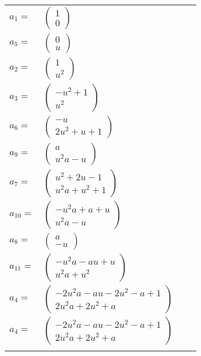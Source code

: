 \documentclass[1p]{elsarticle_modified}
\theoremstyle{definition}
\begin{document}
\begin{tabular}{m{7pt} m{180pt} m{7pt} m{180pt} }
\flushright $a_{1}=$&$\begin{pmatrix}1\\0\end{pmatrix}$ \\
\flushright $a_{5}=$&$\begin{pmatrix}0\\u\end{pmatrix}$ \\
\flushright $a_{2}=$&$\begin{pmatrix}1\\u^2\end{pmatrix}$ \\
\flushright $a_{3}=$&$\begin{pmatrix}- u^2+1\\u^2\end{pmatrix}$ \\
\flushright $a_{6}=$&$\begin{pmatrix}- u\\2 u^2+u+1\end{pmatrix}$ \\
\flushright $a_{9}=$&$\begin{pmatrix}a\\u^2 a- u\end{pmatrix}$ \\
\flushright $a_{7}=$&$\begin{pmatrix}u^2+2 u-1\\u^2 a+u^2+1\end{pmatrix}$ \\
\flushright $a_{10}=$&$\begin{pmatrix}- u^2 a+a+u\\u^2 a- u\end{pmatrix}$ \\
\flushright $a_{8}=$&$\begin{pmatrix}a\\- u\end{pmatrix}$ \\
\flushright $a_{11}=$&$\begin{pmatrix}- u^2 a- a u+u\\u^2 a+u^2\end{pmatrix}$ \\
\flushright $a_{4}=$&$\begin{pmatrix}-2 u^2 a- a u-2 u^2- a+1\\2 u^2 a+2 u^2+a\end{pmatrix}$\\ \flushright $a_{4}=$&$\begin{pmatrix}-2 u^2 a- a u-2 u^2- a+1\\2 u^2 a+2 u^2+a\end{pmatrix}$\\&\end{tabular}
\end{document}
